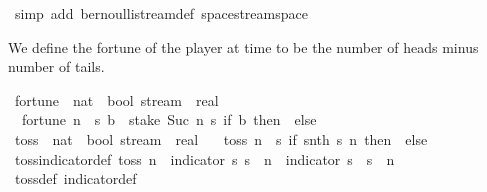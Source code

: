 \begin{isabellebody}
%
\isatagproof
{}\isamarkupfalse%
\ {\isacharparenleft}{\kern0pt}simp\ add{\isacharcolon}{\kern0pt}\ bernoulli{\isacharunderscore}{\kern0pt}stream{\isacharunderscore}{\kern0pt}def\ space{\isacharunderscore}{\kern0pt}stream{\isacharunderscore}{\kern0pt}space{\isacharparenright}{\kern0pt}%
\endisatagproof
{\isafoldproof}%
%
\isadelimproof
%
\endisadelimproof
%
\begin{isamarkuptext}%
We define the fortune of the player at time  to be the number of heads minus number of tails.%
\end{isamarkuptext}\isamarkuptrue%
\isamarkupfalse%
\ fortune\ {\isacharcolon}{\kern0pt}{\isacharcolon}{\kern0pt}\ {\isachardoublequoteopen}nat\ {\isasymRightarrow}\ bool\ stream\ {\isasymRightarrow}\ real{\isachardoublequoteclose}\ \isanewline
\ \ {\isachardoublequoteopen}fortune\ n\ {\isacharequal}{\kern0pt}\ {\isacharparenleft}{\kern0pt}{\isasymlambda}s{\isachardot}{\kern0pt}\ {\isasymSum}b\ {\isasymleftarrow}\ stake\ {\isacharparenleft}{\kern0pt}Suc\ n{\isacharparenright}{\kern0pt}\ s{\isachardot}{\kern0pt}\ if\ b\ then\ {}\ else\ {\isacharminus}{\kern0pt}{}{\isacharparenright}{\kern0pt}{\isachardoublequoteclose}\isanewline
\isanewline
{}\isamarkupfalse%
\ toss\ {\isacharcolon}{\kern0pt}{\isacharcolon}{\kern0pt}\ {\isachardoublequoteopen}nat\ {\isasymRightarrow}\ bool\ stream\ {\isasymRightarrow}\ real{\isachardoublequoteclose}\ \isanewline
\ \ {\isachardoublequoteopen}toss\ n\ {\isacharequal}{\kern0pt}\ {\isacharparenleft}{\kern0pt}{\isasymlambda}s{\isachardot}{\kern0pt}\ if\ snth\ s\ n\ then\ {}\ else\ {\isacharminus}{\kern0pt}{}{\isacharparenright}{\kern0pt}{\isachardoublequoteclose}\isanewline
\isanewline
{}\isamarkupfalse%
\ toss{\isacharunderscore}{\kern0pt}indicator{\isacharunderscore}{\kern0pt}def{\isacharcolon}{\kern0pt}\ {\isachardoublequoteopen}toss\ n\ {\isacharequal}{\kern0pt}\ indicator\ {\isacharbraceleft}{\kern0pt}s{\isachardot}{\kern0pt}\ s\ {\isacharbang}{\kern0pt}{\isacharbang}{\kern0pt}\ n{\isacharbraceright}{\kern0pt}\ {\isacharminus}{\kern0pt}\ indicator\ {\isacharbraceleft}{\kern0pt}s{\isachardot}{\kern0pt}\ {\isasymnot}\ s\ {\isacharbang}{\kern0pt}{\isacharbang}{\kern0pt}\ n{\isacharbraceright}{\kern0pt}{\isachardoublequoteclose}\isanewline
%
\isadelimproof
\ \ %
\endisadelimproof
%
\isatagproof
{}\isamarkupfalse%
\ toss{\isacharunderscore}{\kern0pt}def\ indicator{\isacharunderscore}{\kern0pt}def\ \isamarkupfalse%

\end{isabellebody}
